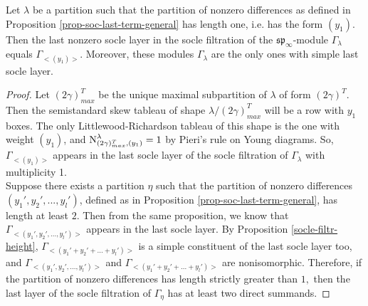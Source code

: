 \documentclass[main.tex]{subfiles}
\begin{document}
\begin{crl}
    Let $\lambda$ be a partition such that the partition of nonzero differences as defined in Proposition \ref{prop-soc-last-term-general} has length one, i.e. has the form $(y_1)$. Then the last nonzero socle layer in the socle filtration of the $\mathfrak{sp}_\infty$-module $\Gamma_\lambda$ equals $\Gamma_{<(y_1)>}$. Moreover, these modules $\Gamma_\lambda$ are the only ones with simple last socle layer.
\end{crl}
\begin{proof}
    Let $(2\gamma)^T_{max}$ be the unique maximal subpartition of $\lambda$ of form $(2\gamma)^T$. Then the semistandard skew tableau of shape $\lambda/(2\gamma)^T_{max}$ will be a row with $y_1$ boxes. The only Littlewood-Richardson tableau of this shape is the one with weight $(y_1)$, and $\text{N}^{\lambda}_{(2\gamma)^T_{max}, (y_1)}=1$ by Pieri's rule on Young diagrams. So, $\Gamma_{<(y_1)>}$ appears in the last socle layer of the socle filtration of $\Gamma_\lambda$ with multiplicity 1.\\
    
    Suppose there exists a partition $\eta$ such that the partition of nonzero differences $(y_1',y_2',...,y_l')$, defined as in Proposition \ref{prop-soc-last-term-general}, has length at least $2.$ Then from the same proposition, we know that $\Gamma_{<(y_1',y_2',...,y_l')>}$ appears in the last socle layer. By Proposition \ref{socle-filtr-height}, $\Gamma_{<(y_1'+y_2'+...+y_l')>}$ is a simple constituent of the last socle layer too, and $\Gamma_{<(y_1',y_2',...,y_l')>}$ and $\Gamma_{<(y_1'+y_2'+...+y_l')>}$ are nonisomorphic. Therefore, if the partition of nonzero differences has length strictly greater than $1,$ then the last layer of the socle filtration of $\Gamma_{\eta}$ has at least two direct summands.
\end{proof}
\end{document}
